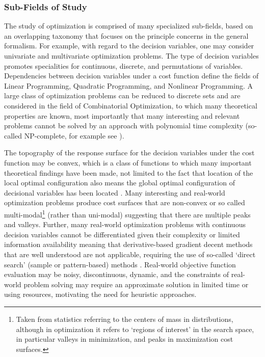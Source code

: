 \begin{bibunit}
\subsubsection{Sub-Fields of Study}
The study of optimization is comprised of many specialized sub-fields, based on an overlapping taxonomy that focuses on the principle concerns in the general formalism. 
For example, with regard to the decision variables, one may consider univariate and multivariate optimization problems. The type of decision variables promotes specialities for continuous, discrete, and permutations of variables. Dependencies between decision variables under a cost function define the fields of Linear Programming, Quadratic Programming, and Nonlinear Programming. A large class of optimization problems can be reduced to discrete sets and are considered in the field of Combinatorial Optimization, to which many theoretical properties are known, most importantly that many interesting and relevant problems cannot be solved by an approach with polynomial time complexity (so-called NP-complete, for example see \cite{Papadimitriou1998}).

The topography of the response surface for the decision variables under the cost function may be convex, which is a class of functions to which many important theoretical findings have been made, not limited to the fact that location of the local optimal configuration also means the global optimal configuration of decisional variables has been located \cite{Boyd2004}. Many interesting and real-world optimization problems produce cost surfaces that are non-convex or so called multi-modal\footnote{Taken from statistics referring to the centers of mass in distributions, although in optimization it refers to `regions of interest' in the search space, in particular valleys in minimization, and peaks in maximization cost surfaces.} (rather than uni-modal) suggesting that there are multiple peaks and valleys. Further, many real-world optimization problems with continuous decision variables cannot be differentiated given their complexity or limited information availability meaning that derivative-based gradient decent methods that are well understood are not applicable, requiring the use of so-called `direct search' (sample or pattern-based) methods \cite{Lewis2000}. Real-world objective function evaluation may be noisy, discontinuous, dynamic, and the constraints of real-world problem solving may require an approximate solution in limited time or using resources, motivating the need for heuristic approaches.



\end{bibunit}
